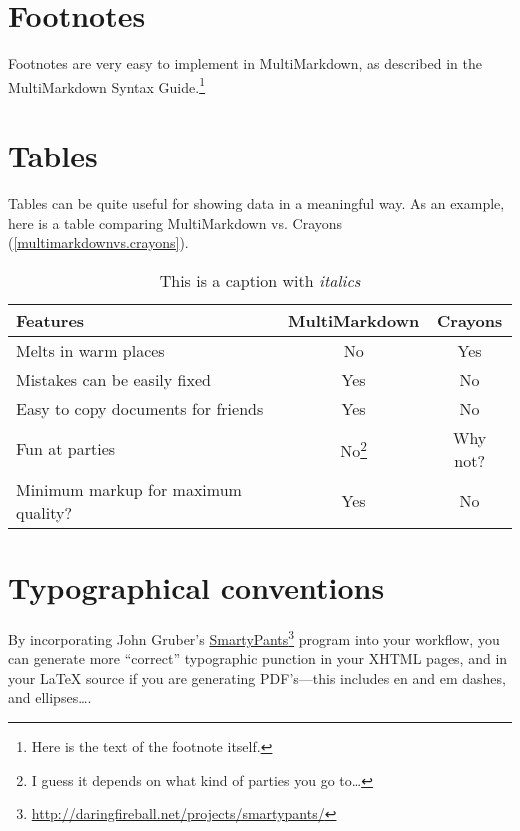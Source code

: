\section{Footnotes}
\label{footnotes}

Footnotes are very easy to implement in MultiMarkdown, as described in the
MultiMarkdown Syntax Guide.\footnote{Here is the text of the footnote itself.}

\section{Tables}
\label{tables}

Tables can be quite useful for showing data in a meaningful way. As an
example, here is a table comparing MultiMarkdown vs. Crayons (\autoref{multimarkdownvs.crayons}).

\begin{table}[htbp]
\begin{minipage}{\linewidth}
\setlength{\tymax}{0.5\linewidth}
\centering
\small
\caption{This is a caption with \emph{italics}}
\label{multimarkdownvs.crayons}
\begin{tabulary}{\textwidth}{@{}LCC@{}} \toprule
Features&MultiMarkdown&Crayons\\
\midrule
Melts in warm places&No&Yes\\
Mistakes can be easily fixed&Yes&No\\
Easy to copy documents for friends&Yes&No\\
Fun at parties&No\footnote{I guess it depends on what kind of parties you go to{\ldots}}&Why not?\\

\midrule
Minimum markup for maximum quality?&Yes&No\\

\bottomrule

\end{tabulary}
\end{minipage}
\end{table}

\section{Typographical conventions}
\label{typographicalconventions}

By incorporating John Gruber's \href{http://daringfireball.net/projects/smartypants/}{SmartyPants}\footnote{\href{http://daringfireball.net/projects/smartypants/}{http:/\slash daringfireball.net\slash projects\slash smartypants\slash }} program into your workflow, you
can generate more ``correct'' typographic punction in your XHTML pages, and in
your LaTeX source if you are generating PDF's---this includes en and em
dashes, and ellipses{\ldots}.

